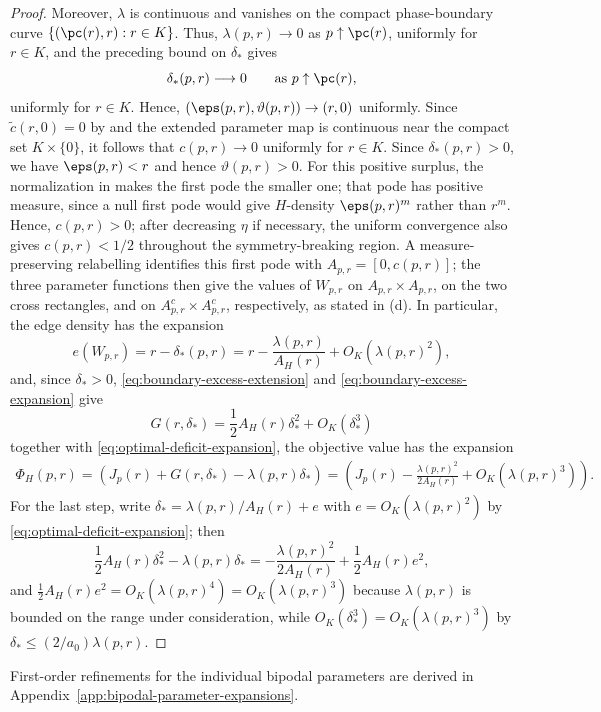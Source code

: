 \begin{proof}
Moreover, $\lambda$ is continuous and vanishes on the compact phase-boundary
curve $\{(\pc(r),r):r\in K\}$.  Thus, $\lambda(p,r)\to0$ as
$p\uparrow\pc(r)$, uniformly for $r\in K$, and the preceding bound on
$\delta_*$ gives
\[
  \delta_*(p,r)\longrightarrow0
  \qquad\text{as }p\uparrow\pc(r),
\]
uniformly for $r\in K$.  Hence,
$(\eps(p,r),\vartheta(p,r))\to(r,0)$ uniformly.  Since
$\widetilde c(r,0)=0$ by  and the extended parameter map is
continuous near the compact set $K\times\{0\}$, it follows that
$c(p,r)\to0$ uniformly for $r\in K$.  Since $\delta_*(p,r)>0$, we have
$\eps(p,r)<r$ and hence $\vartheta(p,r)>0$.  For this positive surplus, the
normalization in  makes the first pode the smaller one; that
pode has positive measure, since a null first pode would give $H$-density
$\eps(p,r)^m$ rather than $r^m$.  Hence, $c(p,r)>0$; after decreasing $\eta$
if necessary, the
uniform convergence also gives $c(p,r)<1/2$ throughout the symmetry-breaking
region.  A
measure-preserving relabelling identifies this first pode with
$A_{p,r}=[0,c(p,r)]$; the three parameter functions then give the values of
$W_{p,r}$ on $A_{p,r}\times A_{p,r}$, on the two cross rectangles, and on
$A_{p,r}^c\times A_{p,r}^c$, respectively, as stated in \textup{(d)}.
In particular, the edge density has the expansion
\[
  e(W_{p,r})=r-\delta_*(p,r)
  =r-\frac{\lambda(p,r)}{A_H(r)}+O_K(\lambda(p,r)^2),
\]
and, since $\delta_*>0$, \eqref{eq:boundary-excess-extension} and
\eqref{eq:boundary-excess-expansion} give
\[
  G(r,\delta_*)=\frac12A_H(r)\delta_*^2+O_K(\delta_*^3)
\]
together with \eqref{eq:optimal-deficit-expansion}, the objective value has the expansion
\begin{align*}
  \Phi_H(p,r)
  =\left(J_p(r)+G(r,\delta_*)-\lambda(p,r)\delta_*\right)
  =\left(J_p(r)-\frac{\lambda(p,r)^2}{2A_H(r)}+O_K(\lambda(p,r)^3)\right).
\end{align*}
For the last step, write $\delta_*=\lambda(p,r)/A_H(r)+e$ with
$e=O_K(\lambda(p,r)^2)$ by \eqref{eq:optimal-deficit-expansion}; then
\[
  \frac12A_H(r)\delta_*^2-\lambda(p,r)\delta_*
  =-\frac{\lambda(p,r)^2}{2A_H(r)}+\frac12A_H(r)e^2,
\]
and $\frac12A_H(r)e^2=O_K(\lambda(p,r)^4)=O_K(\lambda(p,r)^3)$ because
$\lambda(p,r)$ is bounded on the range under consideration, while
$O_K(\delta_*^3)=O_K(\lambda(p,r)^3)$ by $\delta_*\le(2/a_0)\lambda(p,r)$.
\end{proof}

First-order refinements for the individual bipodal parameters are derived in
Appendix~\ref{app:bipodal-parameter-expansions}.